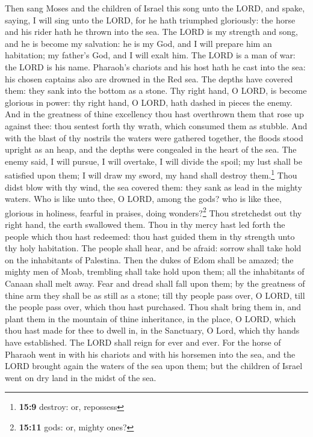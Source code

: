  Then sang Moses and the children of Israel this song unto
the LORD, and spake, saying, I will sing unto the LORD, for he hath
triumphed gloriously: the horse and his rider hath he thrown into the
sea.  The LORD is my strength and song, and he is become
my salvation: he is my God, and I will prepare him an habitation; my
father's God, and I will exalt him.  The LORD is a man of
war: the LORD is his name.  Pharaoh's chariots and his
host hath he cast into the sea: his chosen captains also are drowned in
the Red sea.  The depths have covered them: they sank into
the bottom as a stone.  Thy right hand, O LORD, is become
glorious in power: thy right hand, O LORD, hath dashed in pieces the
enemy.  And in the greatness of thine excellency thou hast
overthrown them that rose up against thee: thou sentest forth thy wrath,
which consumed them as stubble.  And with the blast of thy
nostrils the waters were gathered together, the floods stood upright as
an heap, and the depths were congealed in the heart of the sea.
 The enemy said, I will pursue, I will overtake, I will
divide the spoil; my lust shall be satisfied upon them; I will draw my
sword, my hand shall destroy them.\footnote{\textbf{15:9} destroy: or,
  repossess}  Thou didst blow with thy wind, the sea
covered them: they sank as lead in the mighty waters. 
Who is like unto thee, O LORD, among the gods? who is like thee,
glorious in holiness, fearful in praises, doing wonders?\footnote{\textbf{15:11}
  gods: or, mighty ones?}  Thou stretchedst out thy right
hand, the earth swallowed them.  Thou in thy mercy hast
led forth the people which thou hast redeemed: thou hast guided them in
thy strength unto thy holy habitation.  The people shall
hear, and be afraid: sorrow shall take hold on the inhabitants of
Palestina.  Then the dukes of Edom shall be amazed; the
mighty men of Moab, trembling shall take hold upon them; all the
inhabitants of Canaan shall melt away.  Fear and dread
shall fall upon them; by the greatness of thine arm they shall be as
still as a stone; till thy people pass over, O LORD, till the people
pass over, which thou hast purchased.  Thou shalt bring
them in, and plant them in the mountain of thine inheritance, in the
place, O LORD, which thou hast made for thee to dwell in, in the
Sanctuary, O Lord, which thy hands have established.  The
LORD shall reign for ever and ever.  For the horse of
Pharaoh went in with his chariots and with his horsemen into the sea,
and the LORD brought again the waters of the sea upon them; but the
children of Israel went on dry land in the midst of the sea.

